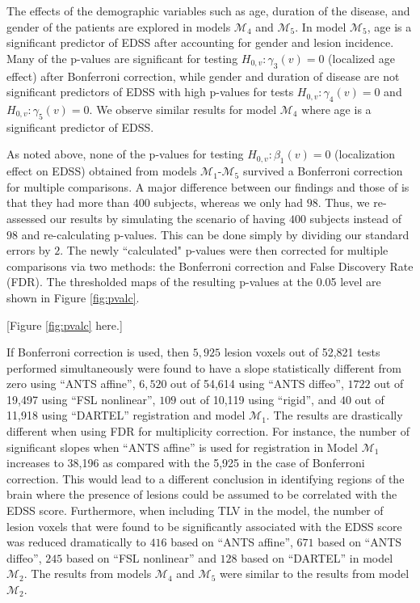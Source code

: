 \documentclass[10pt]{article}
\begin{document}
The effects of the demographic variables such as age, duration of
the disease, and gender of the patients are explored in models
$\mathcal{M}_4$ and $\mathcal{M}_5$.  In model $\mathcal{M}_5$, age
is a significant predictor of EDSS after accounting for gender and
lesion incidence. Many of the p-values are significant for testing
$H_{0,v}:\gamma_3(v)=0$ (localized age effect) after Bonferroni
correction, while gender and duration of disease are not significant
predictors of EDSS with high p-values for tests
$H_{0,v}:\gamma_4(v)=0$ and $H_{0,v}:\gamma_5(v)=0$. We observe
similar results for model $\mathcal{M}_4$ where age is a significant
predictor of EDSS.

As noted above, none of the p-values for testing
$H_{0,v}:\beta_1(v)=0$ (localization effect on EDSS) obtained from
models $\mathcal{M}_1$-$\mathcal{M}_5$  survived a Bonferroni
correction for multiple comparisons. A major difference between our
findings and those of \cite{charil2003statistical} is that they had
more than $400$ subjects, whereas we only had $98$. Thus, we
re-assessed our results by simulating the scenario of having $400$ subjects instead
of $98$ and re-calculating p-values. This can be done simply by
dividing our standard errors by $2$. The newly ``calculated"
p-values were then corrected for multiple comparisons via two
methods: the Bonferroni correction and False Discovery Rate (FDR).
The thresholded maps of the resulting p-values at the 0.05 level are
shown in Figure \ref{fig:pvalc}. 

[Figure \ref{fig:pvalc} here.]

If Bonferroni correction is used, then $5,925$ lesion voxels  out of 52,821 tests performed simultaneously were found to have a slope statistically different from zero using ``ANTS affine'', $6,520$ out of 54,614 using ``ANTS diffeo'', $1722$ out of 19,497 using ``FSL nonlinear'', $109$ out of 10,119 using ``rigid'', and $40$ out of 11,918 using ``DARTEL'' registration and model $\mathcal{M}_1$. The results are drastically different when using FDR for multiplicity correction. For instance, the number of significant slopes when ``ANTS affine'' is used for registration in Model $\mathcal{M}_1$ increases to 38,196 as compared with the 5,925 in the case of Bonferroni correction. This would lead to a different conclusion in identifying regions of the brain where the presence of lesions could be assumed to be correlated with the EDSS score. Furthermore, when including TLV in the model, the number of lesion voxels that were found to be significantly associated with the EDSS score was reduced
dramatically to $416$ based on ``ANTS affine'', $671$ based on ``ANTS
diffeo'', $245$ based on ``FSL nonlinear'' and $128$ based on ``DARTEL'' in model $\mathcal{M}_2$. The results from models $\mathcal{M}_4$ and
$\mathcal{M}_5$ were similar to the results from model $\mathcal{M}_2$. 
\end{document}
